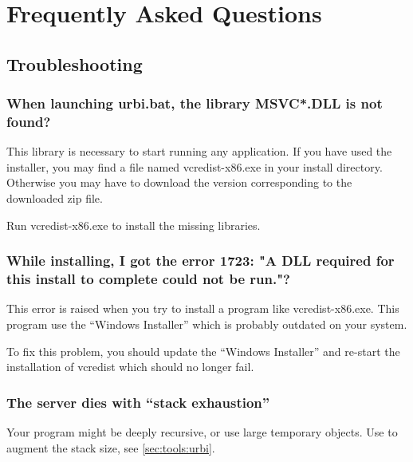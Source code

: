 \chapter{Frequently Asked Questions}
\label{sec:faq}

\ifx\ifHtml\undefined\else
  \let\subsubsectionSave\subsubsection
  \let\subsubsection\faqsection
\fi

\section{Troubleshooting}

\subsection{When launching urbi.bat, the library MSVC*.DLL is not found?}

This library is necessary to start running any application.  If you have
used the installer, you may find a file named vcredist-x86.exe in your
install directory.  Otherwise you may have to download the version
corresponding to the downloaded zip file.

Run vcredist-x86.exe to install the missing libraries.

\subsection{While installing, I got the error 1723: "A DLL required for
this install to complete could not be run."?}

This error is raised when you try to install a program like
vcredist-x86.exe.  This program use the ``Windows Installer'' which is
probably outdated on your system.

To fix this problem, you should update the ``Windows Installer'' and
re-start the installation of vcredist which should no longer fail.

\subsection{The server dies with ``stack exhaustion''}
Your program might be deeply recursive, or use large temporary
objects.  Use  to augment the stack size, see
\autoref{sec:tools:urbi}.

